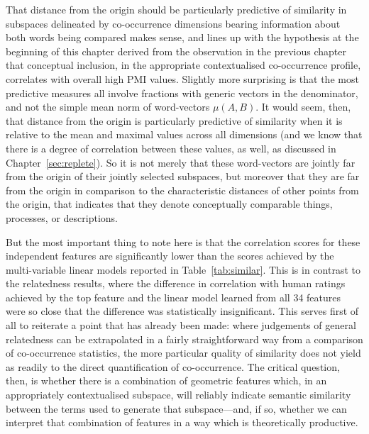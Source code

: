That distance from the origin should be particularly predictive of similarity in subspaces delineated by co-occurrence dimensions bearing information about both words being compared makes sense, and lines up with the hypothesis at the beginning of this chapter derived from the observation in the previous chapter that conceptual inclusion, in the appropriate contextualised co-occurrence profile, correlates with overall high PMI values.  Slightly more surprising is that the most predictive measures all involve fractions with generic vectors in the denominator, and not the simple mean norm of word-vectors $\mu(A,B)$.  It would seem, then, that distance from the origin is particularly predictive of similarity when it is relative to the mean and maximal values across all dimensions (and we know that there is a degree of correlation between these values, as well, as discussed in Chapter~\ref{sec:replete}).  So it is not merely that these word-vectors are jointly far from the origin of their jointly selected subspaces, but moreover that they are far from the origin in comparison to the characteristic distances of other points from the origin, that indicates that they denote conceptually comparable things, processes, or descriptions.

But the most important thing to note here is that the correlation scores for these independent features are significantly lower than the scores achieved by the multi-variable linear models reported in Table~\ref{tab:similar}.  This is in contrast to the relatedness results, where the difference in correlation with human ratings achieved by the top feature and the linear model learned from all 34 features were so close that the difference was statistically insignificant.  This serves first of all to reiterate a point that has already been made: where judgements of general relatedness can be extrapolated in a fairly straightforward way from a comparison of co-occurrence statistics, the more particular quality of similarity does not yield as readily to the direct quantification of co-occurrence.  The critical question, then, is whether there is a combination of geometric features which, in an appropriately contextualised subspace, will reliably indicate semantic similarity between the terms used to generate that subspace---and, if so, whether we can interpret that combination of features in a way which is theoretically productive.

